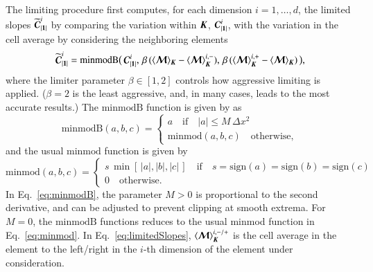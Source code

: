 \documentclass[11pt,letterpaper,twoside,english,final]{article}
\begin{document}
The limiting procedure first computes, for each dimension $i=1,\ldots,d$, the limited slopes $\widetilde{\boldsymbol{\mathcal{C}}}_{|\boldsymbol{1}|}^{i}$ by comparing the variation within $\boldsymbol{K}$, $\boldsymbol{\mathcal{C}}_{|\boldsymbol{1}|}^{i}$, with the variation in the cell average by considering the neighboring elements
\begin{equation}
  \widetilde{\boldsymbol{\mathcal{C}}}_{|\boldsymbol{1}|}^{i}
  =\text{minmodB}
  \big(\,
    \boldsymbol{\mathcal{C}}_{|\boldsymbol{1}|}^{i},\,
    \beta\,(\langle\boldsymbol{\mathcal{M}}\rangle_{\boldsymbol{K}}-\langle\boldsymbol{\mathcal{M}}\rangle_{\boldsymbol{K}}^{i,-}),\,
    \beta\,(\langle\boldsymbol{\mathcal{M}}\rangle_{\boldsymbol{K}}^{i,+}-\langle\boldsymbol{\mathcal{M}}\rangle_{\boldsymbol{K}})
  \,\big),
  \label{eq:limitedSlopes}
\end{equation}
where the limiter parameter $\beta\in[1,2]$ controls how aggressive limiting is applied.  
($\beta=2$ is the least aggressive, and, in many cases, leads to the most accurate results.)  
The $\text{minmodB}$ function is given by \citet{cockburnShu_2001} as
\begin{equation}
  \mbox{minmodB}(a,b,c)
  =\left\{\begin{array}{ll}
  a \quad\text{if}\quad |a|\le M\,\Delta x^{2} \\
  \mbox{minmod}(a,b,c) \quad \text{otherwise},
  \end{array}\right.
  \label{eq:minmodB}
\end{equation}
and the usual $\text{minmod}$ function is given by
\begin{equation}
  \mbox{minmod}(a,b,c)
  =\left\{\begin{array}{ll}
  s\,\min[\,|a|,|b|,|c|\,] \quad\text{if}\quad s=\mbox{sign}(a)=\mbox{sign}(b)=\mbox{sign}(c) \\
  0 \quad \text{otherwise}.
  \end{array}\right.
  \label{eq:minmod}
\end{equation}
In Eq.~\eqref{eq:minmodB}, the parameter $M>0$ is proportional to the second derivative, and can be adjusted to prevent clipping at smooth extrema.  
For $M=0$, the $\text{minmodB}$ functions reduces to the usual minmod function in Eq.~\eqref{eq:minmod}.  
In Eq.~\eqref{eq:limitedSlopes}, $\langle\boldsymbol{\mathcal{M}}\rangle_{\boldsymbol{K}}^{i,-/+}$ is the cell average in the element to the left/right in the $i$-th dimension of the element under consideration.  
\end{document}

